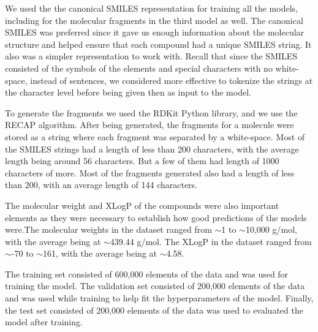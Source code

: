	We used the the canonical SMILES  representation for training all the models, including for the molecular fragments in the third model as well.
	The canonical SMILES was preferred since it gave us enough information about the molecular structure and helped ensure that each compound had a unique SMILES string. It also was a simpler representation to work with. Recall that since the SMILES consisted of the symbols of the elements and special characters with no white-space, instead of sentences, we considered more effective to tokenize the strings at the character level before being given then as input to the model. 
	
	To generate the fragments we used the RDKit \cite{rdkit} Python library, and we use  the RECAP algorithm. 
	 After being generated, the fragments for a molecule  were stored as a string where each fragment was separated by a white-space.
	Most of the SMILES strings had a length of less than 200 characters, with the average length being around 56 characters. But a few of them had length of 1000 characters of more. Most of the fragments generated also had a length of less than 200, with an average length of 144 characters. 
	
	The molecular weight and XLogP of the compounds were also important elements as they were necessary to establish how good predictions of the models were.The molecular weights in the dataset ranged from $\sim$1 to $\sim$10,000 g/mol, with the average being at $\sim$439.44 g/mol.
The XLogP in the dataset ranged from $\sim$-70 to $\sim$161, with the average being at $\sim$4.58.
	
	   The training set consisted of 600,000 elements of the data and was used for training the model.
             The validation set consisted of 200,000 elements of the data and was used while training to help fit the hyperparameters of the model.
             Finally, the test set consisted of 200,000 elements of the data was used to evaluated the model after training.
            
